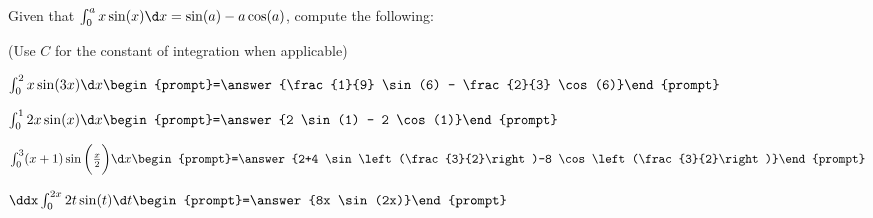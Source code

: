 \documentclass{ximera}
\author{Jim Talamo}
\begin{document}
\begin{exercise}
Given that $ \int_0^a x \sin(x) \d x = \sin(a)-a \cos(a)$, compute the following:

\begin{prompt} (Use $C$ for the constant of integration when applicable) \end{prompt}

$ \int_0^2 x \sin(3x) \d x \begin{prompt}=\answer{\frac{1}{9} \sin(6) - \frac{2}{3} \cos(6)}\end{prompt}$


$ \int_0^1 2x \sin(x) \d x \begin{prompt}=\answer{2 \sin(1) - 2 \cos(1)}\end{prompt}$

$ \int_0^3 (x+1) \sin\bigg(\frac{x}{2}\bigg) \d x \begin{prompt}=\answer{2+4 \sin\left(\frac{3}{2}\right)-8 \cos\left(\frac{3}{2}\right)}\end{prompt}$

$\ddx  \int_0^{2x} 2t \sin(t) \d t  \begin{prompt}=\answer{8x \sin(2x)}\end{prompt}$

\end{exercise}
\end{document}
